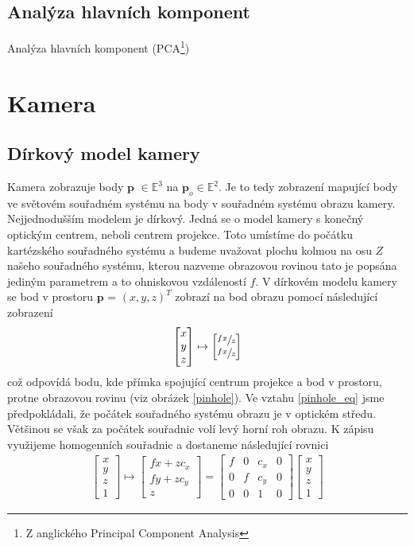\documentclass[twoside]{ctuthesis}
\newcommand{\tl}[1]{$\mathbf{#1}$}
\begin{document}
\section{Analýza hlavních komponent}
Analýza hlavních komponent (PCA\footnote{Z anglického Principal Component Analysis}) 

\chapter{Kamera}

\section{Dírkový model kamery}
Kamera zobrazuje body \tl{p} $\in \mathbb{E}^3$ na $\mathbf{p}_{o} \in \mathbb{E}^2$. Je to tedy zobrazení mapující body ve světovém souřadném systému na body v souřadném systému obrazu kamery. Nejjednodušším modelem je dírkový. Jedná se o model kamery s konečný optickým centrem, neboli centrem projekce. Toto umístíme do počátku kartézského souřadného systému a budeme uvažovat plochu kolmou na osu $Z$ našeho souřadného systému, kterou nazveme obrazovou rovinou tato je popsána jediným parametrem a to ohniskovou vzdáleností $f$. V dírkovém modelu kamery se bod v prostoru \tl{p} = $(x,y,z)^T$ zobrazí na bod obrazu pomocí následující zobrazení
\begin{align}
    \begin{bmatrix} x \\ y \\ z \end{bmatrix} \mapsto \begin{bmatrix} \sfrac{fx}{z} \\ \sfrac{fx}{z} \end{bmatrix}
    \label{pinhole_eq}
\end{align}
což odpovídá bodu, kde přímka spojující centrum projekce a bod v prostoru, protne obrazovou rovinu (viz obrázek \ref{pinhole}). Ve vztahu \ref{pinhole_eq} jsme předpokládali, že počátek souřadného systému obrazu je v optickém středu. Většinou se však za počátek souřadnic volí levý horní roh obrazu. K zápisu využijeme homogenních souřadnic a dostaneme následující rovnici
\begin{align}
    \begin{bmatrix} x \\ y \\ z \\ 1 \end{bmatrix} \mapsto \begin{bmatrix} fx + zc_x \\ fy + zc_y \\ z \end{bmatrix} = \begin{bmatrix} f & 0 & c_x & 0 \\ 0 & f & c_y & 0 \\ 0 & 0 & 1 &0 \end{bmatrix} \begin{bmatrix} x \\ y \\ z \\ 1 \end{bmatrix}
    \label{pinhole_homogenous}
\end{align}
\end{document}
